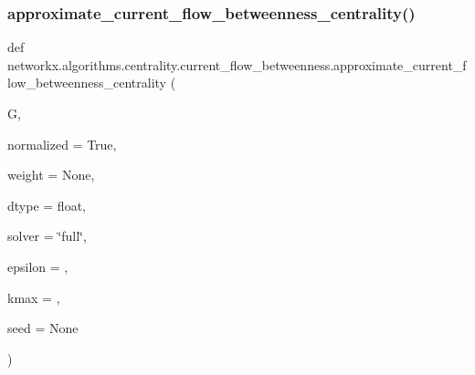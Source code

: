 \subsubsection{\texorpdfstring{approximate\+\_\+current\+\_\+flow\+\_\+betweenness\+\_\+centrality()}{approximate\_current\_flow\_betweenness\_centrality()}}
{\footnotesize\ttfamily def networkx.\+algorithms.\+centrality.\+current\+\_\+flow\+\_\+betweenness.\+approximate\+\_\+current\+\_\+flow\+\_\+betweenness\+\_\+centrality (\begin{DoxyParamCaption}\item[{}]{G,  }\item[{}]{normalized = {\ttfamily True},  }\item[{}]{weight = {\ttfamily None},  }\item[{}]{dtype = {\ttfamily float},  }\item[{}]{solver = {\ttfamily \char`\"{}full\char`\"{}},  }\item[{}]{epsilon = {},  }\item[{}]{kmax = {},  }\item[{}]{seed = {\ttfamily None} }\end{DoxyParamCaption})}

